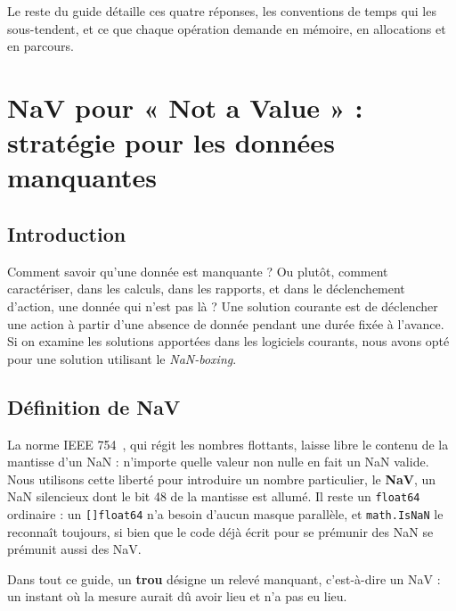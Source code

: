 \documentclass[11pt,a4paper]{report}
\begin{document}
Le reste du guide détaille ces quatre réponses, les conventions de temps
qui les sous-tendent, et ce que chaque opération demande en mémoire, en
allocations et en parcours.


\chapter{NaV pour « Not a Value » : stratégie pour les données
manquantes}\label{chap:nav}

\section{Introduction}
Comment savoir qu'une donnée est manquante ? Ou plutôt, comment
caractériser, dans les calculs, dans les rapports, et dans le
déclenchement d'action, une donnée qui n'est pas là ? Une solution
courante est de déclencher une action à partir d'une absence de donnée
pendant une durée fixée à l'avance. Si on examine les solutions
apportées dans les logiciels courants, nous avons opté pour une solution
utilisant le \emph{NaN-boxing}.

\section{Définition de NaV}

La norme IEEE 754~\cite{ieee754}, qui régit les nombres flottants, laisse libre le
contenu de la mantisse d'un NaN : n'importe quelle valeur non nulle en
fait un NaN valide. Nous utilisons cette liberté pour introduire un
nombre particulier, le \textbf{NaV}, un NaN silencieux dont le bit 48 de
la mantisse est allumé. Il reste un \texttt{float64} ordinaire : un
\texttt{[]float64} n'a besoin d'aucun masque parallèle, et
\texttt{math.IsNaN} le reconnaît toujours, si bien que le code déjà
écrit pour se prémunir des NaN se prémunit aussi des NaV.

Dans tout ce guide, un \textbf{trou} désigne un relevé manquant,
c'est-à-dire un NaV : un instant où la mesure aurait dû avoir lieu et
n'a pas eu lieu.
\end{document}
